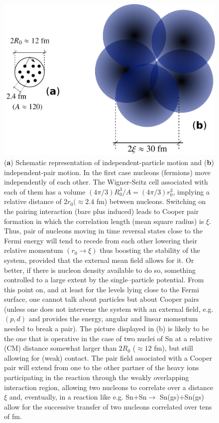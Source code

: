 \begin{figure}
\centerline{\includegraphics*[width=14cm,angle=0]{nutshell/figs/fig3_1_4.pdf}}
\caption{(\textbf{a}) Schematic representation of independent-particle motion and (\textbf{b}) independent-pair motion. In the first case nucleons (fermions) move independently of each other. The Wigner-Seitz cell associated with each of them has a  volume $(4\pi/3)R_0^3/A=(4\pi/3)r_0^3$, implying a relative distance of $2r_0(\approx 2.4$ fm) between nucleons. Switching on the pairing interaction (bare plus induced) leads to Cooper pair formation in which the correlation length (mean square radius) is $\xi$. Thus, pair of nucleons moving in time reversal states close to the Fermi energy will tend to recede from each other lowering their relative momentum $(r_0\rightarrow \xi)$ thus boosting the stability of the system, provided that the external mean field allows for it. Or better, if  there is nucleon density available to do so, something controlled to a large extent by the single--particle potential. From this point on, and at least for the levels lying close to the Fermi surface, one cannot talk about particles but about Cooper pairs (unless one does not intervene the system with an external field, e.g. $(p,d)$ and provides the energy, angular and linear momentum needed to break a pair). The picture displayed in (b) is likely to be the one that is operative in the case of two nuclei of Sn at a relative (CM) distance somewhat larger than $2R_0$ ($\approx 12$ fm), but still allowing for  (weak) contact. The pair field associated with a Cooper pair will extend from one to the other partner of the heavy ions participating in the reaction through the weakly overlapping interaction region, allowing two nucleons to correlate over a distance $\xi$ and, eventually, in a reaction like e.g. Sn+Sn$\rightarrow$ Sn(gs)+Sn(gs) allow for the successive transfer of two nucleons correlated over tens of fm.}\label{fig3.2.1}
\end{figure}
